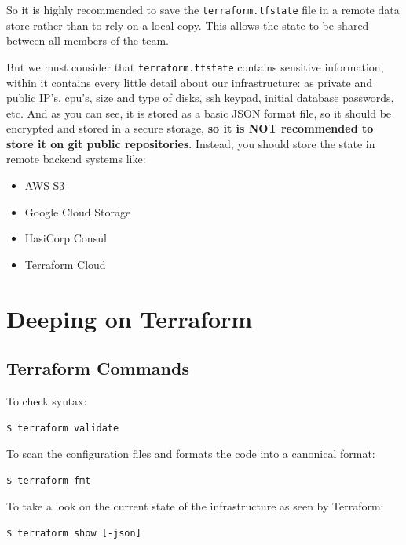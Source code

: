 \documentclass{article}
\newenvironment{codetemplate}[1][]{%
  \mybasecolorbox[#1]
  \itshape
}{%
  \endmybasecolorbox
}
\begin{document}
So it is highly recommended to save the \verb+terraform.tfstate+ file in a remote data store rather than to rely on a local copy. This allows the state to be shared between all members of the team.

But we must consider that \verb+terraform.tfstate+ contains sensitive information, within it contains every little detail about our infrastructure: as private and public IP's, cpu's, size and type of disks, ssh keypad, initial database passwords, etc. And as you can see, it is stored as a basic JSON format file, so it should be encrypted and stored in a secure storage, \textbf{so it is NOT recommended to store it on git public repositories}. Instead, you should store the state in remote backend systems like:
\begin{itemize}
    \item AWS S3
    \item Google Cloud Storage
    \item HasiCorp Consul
    \item Terraform Cloud
\end{itemize}

\newpage
\section{Deeping on Terraform}

\subsection{Terraform Commands}
To check syntax: 
\begin{codetemplate}{}
\begin{verbatim}
$ terraform validate
\end{verbatim}
\end{codetemplate}

To scan the configuration files and formats the code into a canonical format:
\begin{codetemplate}{}
\begin{verbatim}
$ terraform fmt
\end{verbatim}
\end{codetemplate}

To take a look on the current state of the infrastructure as seen by Terraform:
\begin{codetemplate}{}
\begin{verbatim}
$ terraform show [-json]
\end{verbatim}
\end{codetemplate}
\end{document}
